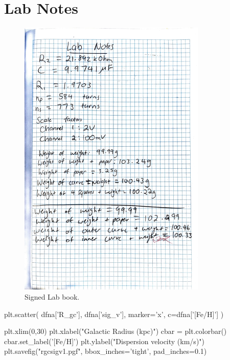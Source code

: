 \documentclass{article}
\begin{document}
\section{Lab Notes}
\begin{figure}[H]
    \centering
    \includegraphics[width=0.8\textwidth]{labbook.jpg}
    \caption{Signed Lab book.}
\end{figure}

\begin{python}
plt.scatter(
    dfna['R_gc'],
    dfna['sig_v'],
    marker='x',
    c=dfna['[Fe/H]']
)

plt.xlim(0,30)
plt.xlabel("Galactic Radius (kpc)")
cbar = plt.colorbar()
cbar.set_label('[Fe/H]')
plt.ylabel("Dispersion velocity (km/s)")
plt.savefig("rgcsigv1.pgf", bbox_inches='tight', pad_inches=0.1)
\end{python}

\begin{python}

\end{python}
\end{document}
